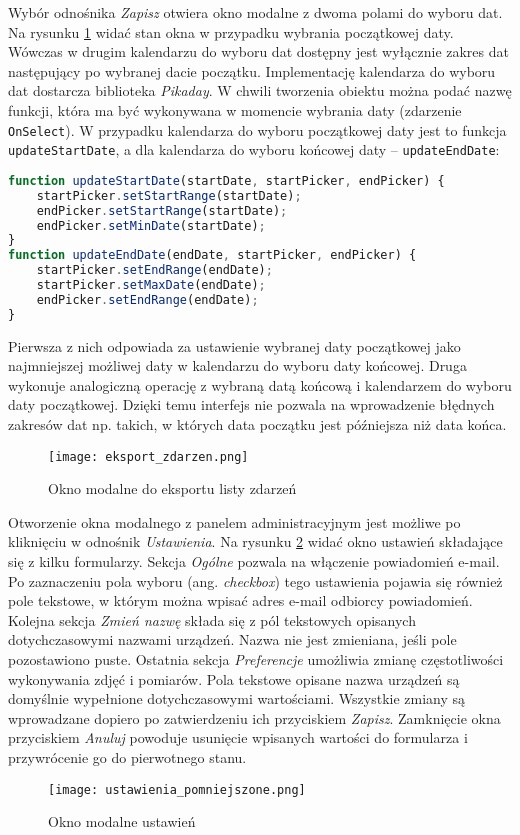 \documentclass[a4paper,11pt,twoside]{article}
\begin{document}
Wybór odnośnika \textit{Zapisz} otwiera okno modalne z dwoma polami do wyboru dat. Na rysunku \ref{fig: eksport} widać stan okna w przypadku wybrania początkowej daty. Wówczas w drugim kalendarzu do wyboru dat dostępny jest wyłącznie zakres dat następujący po wybranej dacie początku. Implementację kalendarza do wyboru dat dostarcza biblioteka \textit{Pikaday}\cite{pikaday}. W chwili tworzenia obiektu można podać nazwę funkcji, która ma być wykonywana w momencie wybrania daty (zdarzenie \texttt{OnSelect}). W przypadku kalendarza do wyboru początkowej daty jest to funkcja \texttt{updateStartDate}, a dla kalendarza do wyboru końcowej daty -- \texttt{updateEndDate}:
\begin{lstlisting}[language=JavaScript]
function updateStartDate(startDate, startPicker, endPicker) {
    startPicker.setStartRange(startDate);
    endPicker.setStartRange(startDate);
    endPicker.setMinDate(startDate);
}
function updateEndDate(endDate, startPicker, endPicker) {
    startPicker.setEndRange(endDate);
    startPicker.setMaxDate(endDate);
    endPicker.setEndRange(endDate);
}
\end{lstlisting}
Pierwsza z nich odpowiada za ustawienie wybranej daty początkowej jako najmniejszej możliwej daty w kalendarzu do wyboru daty końcowej. Druga wykonuje analogiczną operację z wybraną datą końcową i kalendarzem do wyboru daty początkowej. Dzięki temu interfejs nie pozwala na wprowadzenie błędnych zakresów dat np. takich, w których data początku jest późniejsza niż data końca.
\begin{figure}[H]
\begin{center}
\texttt{[image: eksport\_zdarzen.png]}
\caption{Okno modalne do eksportu listy zdarzeń}
\label{fig: eksport}
\end{center}
\end{figure}

Otworzenie okna modalnego z panelem administracyjnym jest możliwe po kliknięciu w odnośnik \textit{Ustawienia}. Na rysunku \ref{fig: ustawienia} widać okno ustawień składające się z kilku formularzy. Sekcja \textit{Ogólne} pozwala na włączenie powiadomień e-mail. Po zaznaczeniu pola wyboru (ang. \textit{checkbox}) tego ustawienia pojawia się również pole tekstowe, w którym można wpisać adres e-mail odbiorcy powiadomień. Kolejna sekcja \textit{Zmień nazwę} składa się z pól tekstowych opisanych dotychczasowymi nazwami urządzeń. Nazwa nie jest zmieniana, jeśli pole pozostawiono puste. Ostatnia sekcja \textit{Preferencje} umożliwia zmianę częstotliwości wykonywania zdjęć i pomiarów. Pola tekstowe opisane nazwa urządzeń są domyślnie wypełnione dotychczasowymi wartościami. Wszystkie zmiany są wprowadzane dopiero po zatwierdzeniu ich przyciskiem \textit{Zapisz}. Zamknięcie okna przyciskiem \textit{Anuluj} powoduje usunięcie wpisanych wartości do formularza i przywrócenie go do pierwotnego stanu.
\begin{figure}[H]
\begin{center}
\texttt{[image: ustawienia\_pomniejszone.png]}
\caption{Okno modalne ustawień}
\label{fig: ustawienia}
\end{center}
\end{figure}
\end{document}
